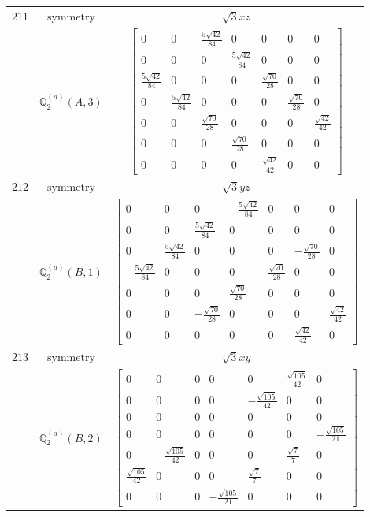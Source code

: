 \documentclass[fleqn,8pt,landscape]{jsarticle}
\begin{document}
\begin{longtable}{ccc}
$ 211 $ & $ \text{symmetry} $ & $ \sqrt{3} x z $ \\
$  $ & $ \mathbb{Q}_{2}^{(a)}(A,3) $ & $ \begin{bmatrix} 0 & 0 & \frac{5 \sqrt{42}}{84} & 0 & 0 & 0 & 0 \\ 0 & 0 & 0 & \frac{5 \sqrt{42}}{84} & 0 & 0 & 0 \\ \frac{5 \sqrt{42}}{84} & 0 & 0 & 0 & \frac{\sqrt{70}}{28} & 0 & 0 \\ 0 & \frac{5 \sqrt{42}}{84} & 0 & 0 & 0 & \frac{\sqrt{70}}{28} & 0 \\ 0 & 0 & \frac{\sqrt{70}}{28} & 0 & 0 & 0 & \frac{\sqrt{42}}{42} \\ 0 & 0 & 0 & \frac{\sqrt{70}}{28} & 0 & 0 & 0 \\ 0 & 0 & 0 & 0 & \frac{\sqrt{42}}{42} & 0 & 0 \end{bmatrix} $ \\ \hline
$ 212 $ & $ \text{symmetry} $ & $ \sqrt{3} y z $ \\
$  $ & $ \mathbb{Q}_{2}^{(a)}(B,1) $ & $ \begin{bmatrix} 0 & 0 & 0 & - \frac{5 \sqrt{42}}{84} & 0 & 0 & 0 \\ 0 & 0 & \frac{5 \sqrt{42}}{84} & 0 & 0 & 0 & 0 \\ 0 & \frac{5 \sqrt{42}}{84} & 0 & 0 & 0 & - \frac{\sqrt{70}}{28} & 0 \\ - \frac{5 \sqrt{42}}{84} & 0 & 0 & 0 & \frac{\sqrt{70}}{28} & 0 & 0 \\ 0 & 0 & 0 & \frac{\sqrt{70}}{28} & 0 & 0 & 0 \\ 0 & 0 & - \frac{\sqrt{70}}{28} & 0 & 0 & 0 & \frac{\sqrt{42}}{42} \\ 0 & 0 & 0 & 0 & 0 & \frac{\sqrt{42}}{42} & 0 \end{bmatrix} $ \\ \hline
$ 213 $ & $ \text{symmetry} $ & $ \sqrt{3} x y $ \\
$  $ & $ \mathbb{Q}_{2}^{(a)}(B,2) $ & $ \begin{bmatrix} 0 & 0 & 0 & 0 & 0 & \frac{\sqrt{105}}{42} & 0 \\ 0 & 0 & 0 & 0 & - \frac{\sqrt{105}}{42} & 0 & 0 \\ 0 & 0 & 0 & 0 & 0 & 0 & 0 \\ 0 & 0 & 0 & 0 & 0 & 0 & - \frac{\sqrt{105}}{21} \\ 0 & - \frac{\sqrt{105}}{42} & 0 & 0 & 0 & \frac{\sqrt{7}}{7} & 0 \\ \frac{\sqrt{105}}{42} & 0 & 0 & 0 & \frac{\sqrt{7}}{7} & 0 & 0 \\ 0 & 0 & 0 & - \frac{\sqrt{105}}{21} & 0 & 0 & 0 \end{bmatrix} $ \\ \hline

\end{longtable}
\end{document}
